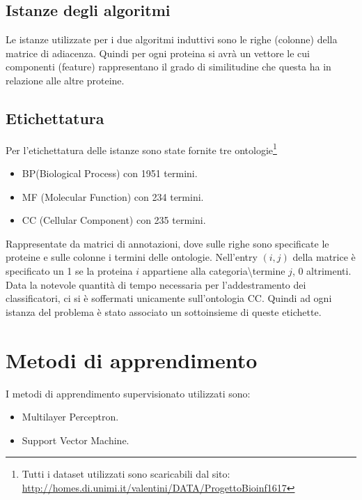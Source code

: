 \documentclass{article}
\begin{document}
\subsection{Istanze degli algoritmi}
Le istanze utilizzate per i due algoritmi induttivi sono le righe (colonne) della matrice di adiacenza. Quindi per ogni proteina si avrà un vettore le cui componenti (feature) rappresentano il grado di similitudine che questa ha in relazione alle altre proteine. 

\subsection{Etichettatura}
Per l'etichettatura delle istanze sono state fornite tre ontologie\footnote{Tutti i dataset utilizzati sono scaricabili dal sito:
\url{http://homes.di.unimi.it/valentini/DATA/ProgettoBioinf1617}}
\begin{itemize}
\item BP(Biological Process) con 1951 termini.
\item MF (Molecular Function) con 234 termini.
\item CC (Cellular Component) con 235 termini.
\end{itemize} 
Rappresentate da matrici di annotazioni, dove sulle righe sono specificate le proteine e sulle colonne i termini delle ontologie. Nell'entry $(i,j)$ della matrice è specificato un 1 se la proteina $i$ appartiene alla categoria\textbackslash termine $j$, 0 altrimenti.
\newline
\newline
Data la notevole quantità di tempo necessaria per l'addestramento dei classificatori, ci si è soffermati unicamente sull'ontologia CC. Quindi ad ogni istanza del problema è stato associato un sottoinsieme di queste etichette.

\section{Metodi di apprendimento}

I metodi di apprendimento supervisionato utilizzati sono:
\begin{itemize}
\item Multilayer Perceptron.
\item Support Vector Machine.
\end{itemize}
\end{document}
